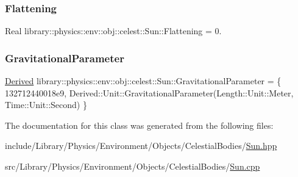 \subsubsection{\texorpdfstring{Flattening}{Flattening}}
{\footnotesize\ttfamily Real library\+::physics\+::env\+::obj\+::celest\+::\+Sun\+::\+Flattening = 0.\hspace{0.3cm}{\ttfamily [static]}}

\mbox{\label{classlibrary_1_1physics_1_1env_1_1obj_1_1celest_1_1_sun_abdaf89ab0651e1cd00701de41f728427}} 
\subsubsection{\texorpdfstring{Gravitational\+Parameter}{GravitationalParameter}}
{\footnotesize\ttfamily \hyperlink{classlibrary_1_1physics_1_1units_1_1_derived}{Derived} library\+::physics\+::env\+::obj\+::celest\+::\+Sun\+::\+Gravitational\+Parameter = \{ 132712440018e9, Derived\+::\+Unit\+::\+Gravitational\+Parameter(\+Length\+::\+Unit\+::\+Meter, Time\+::\+Unit\+::\+Second) \}\hspace{0.3cm}{\ttfamily [static]}}



The documentation for this class was generated from the following files\+:\begin{DoxyCompactItemize}
\item 
include/\+Library/\+Physics/\+Environment/\+Objects/\+Celestial\+Bodies/\hyperlink{_sun_8hpp}{Sun.\+hpp}\item 
src/\+Library/\+Physics/\+Environment/\+Objects/\+Celestial\+Bodies/\hyperlink{_sun_8cpp}{Sun.\+cpp}\end{DoxyCompactItemize}
